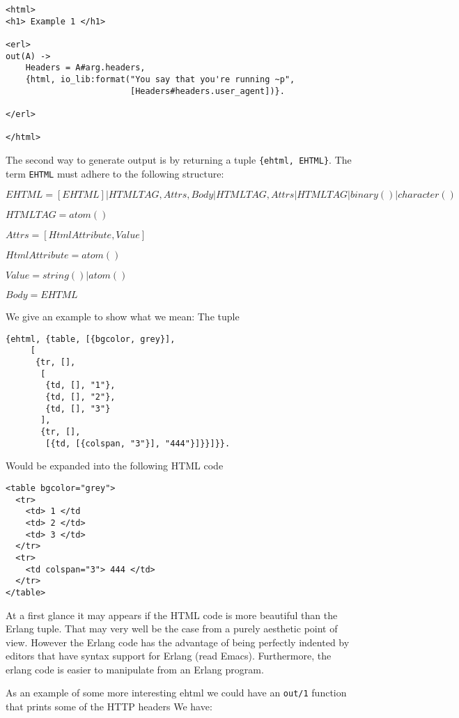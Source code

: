 \documentclass[11pt,oneside,english]{book}
\begin{document}
\begin{verbatim}
<html>
<h1> Example 1 </h1>

<erl>
out(A) ->
    Headers = A#arg.headers,
    {html, io_lib:format("You say that you're running ~p",
                         [Headers#headers.user_agent])}.

</erl>

</html>

\end{verbatim}


The second way to generate output is by returning a tuple
\verb+{ehtml, EHTML}+. The term \verb+EHTML+ must adhere to the 
following structure:

$EHTML = [EHTML] | {HTMLTAG, Attrs, Body} | {HTMLTAG, Attrs} | {HTMLTAG} |
        binary() | character()$

$HTMLTAG 	 = atom()$

$Attrs = [{HtmlAttribute, Value}]$

$HtmlAttribute 	 = atom()$

$Value = string() | atom()$

$Body  = EHTML$

We give an example to show what we mean:
The tuple 
\begin{verbatim}
{ehtml, {table, [{bgcolor, grey}],
	 [
	  {tr, [], 
	   [
	    {td, [], "1"},
	    {td, [], "2"},
	    {td, [], "3"}
	   ],
	   {tr, [],
	    [{td, [{colspan, "3"}], "444"}]}}]}}.
\end{verbatim}

Would be expanded into the following HTML code
\begin{verbatim}
<table bgcolor="grey">
  <tr>
    <td> 1 </td
    <td> 2 </td>
    <td> 3 </td>
  </tr>
  <tr>
    <td colspan="3"> 444 </td>
  </tr>
</table>

\end{verbatim}

At a first glance it may appears if the HTML code is more
beautiful than the Erlang tuple. That may very well be the
case from a purely aesthetic point of view. However the
Erlang code has the advantage of being perfectly indented by editors
that have syntax support for Erlang (read Emacs). Furthermore, the erlang
code is easier to manipulate from an Erlang program.

As an example of some more interesting ehtml we could have
an \verb+out/1+ function that prints some of the HTTP headers
We have:

    
\end{document}
